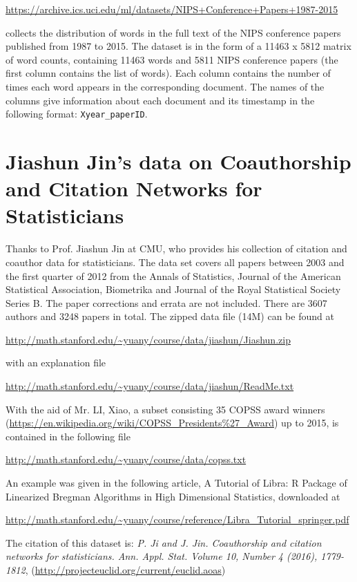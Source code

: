\documentclass[11pt]{article}
\begin{document}
\url{https://archive.ics.uci.edu/ml/datasets/NIPS+Conference+Papers+1987-2015}

\noindent collects the distribution of words in the full text of the NIPS conference papers published from 1987 to 2015. The dataset is in the form of a 11463 x 5812 matrix of word counts, containing 11463 words and 5811 NIPS conference papers (the first column contains the list of words). Each column contains the number of times each word appears in the corresponding document. The names of the columns give information about each document and its timestamp in the following format: {\texttt{Xyear\_paperID}}. 


\section{Jiashun Jin's data on Coauthorship and Citation Networks for Statisticians}
Thanks to Prof. Jiashun Jin at CMU, who provides his collection of citation and coauthor data for statisticians. The data set covers all papers between 2003 and the first quarter of 2012 from the Annals of Statistics, Journal of the American Statistical Association, Biometrika and Journal of the Royal Statistical Society Series B. The paper corrections and errata are not included. There are 3607 authors and 3248 papers in total. The zipped data file (14M) can be found at 

\url{http://math.stanford.edu/~yuany/course/data/jiashun/Jiashun.zip}

\noindent with an explanation file

\url{http://math.stanford.edu/~yuany/course/data/jiashun/ReadMe.txt}

With the aid of Mr. LI, Xiao, a subset consisting 35 COPSS award winners (\url{https://en.wikipedia.org/wiki/COPSS_Presidents\%27_Award}) up to 2015, is contained in the following file

\url{http://math.stanford.edu/~yuany/course/data/copss.txt} 

\noindent An example was given in the following article, A Tutorial of Libra: R Package of Linearized Bregman Algorithms in High Dimensional Statistics, downloaded at

\url{http://math.stanford.edu/~yuany/course/reference/Libra_Tutorial_springer.pdf}

The citation of this dataset is: \emph{P. Ji and J. Jin. Coauthorship and citation networks for statisticians. Ann. Appl. Stat. Volume 10, Number 4 (2016), 1779-1812}, (\url{http://projecteuclid.org/current/euclid.aoas})
\end{document}

